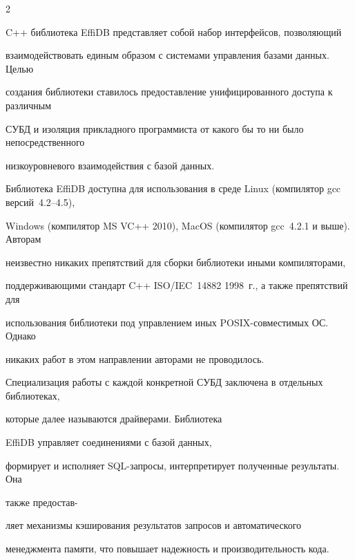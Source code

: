 \begin{multicols}{2}
\vspace*{-6pt}



C++ библиотека EffiDB представляет собой набор интерфейсов, позволяющий 

взаимодействовать единым образом с системами управления базами данных. Целью 

создания библиотеки ставилось предоставление унифицированного доступа к различным 

СУБД и изоляция прикладного программиста от какого бы то ни было непосредственного 

низкоуровневого взаимодействия с базой данных. 



Библиотека EffiDB доступна для использования в среде Linux (компилятор gcc версий~4.2--4.5), 

Windows (компилятор MS VC++ 2010), MacOS (компилятор gcc~4.2.1 и выше). Авторам 

неизвестно никаких препятствий для сборки библиотеки иными компиляторами, 

поддерживающими стандарт C++ ISO/IEC~14882 1998~г., а также препятствий для 

использования библиотеки под управлением иных POSIX-со\-вмес\-ти\-мых ОС. Однако 

никаких работ в этом направлении авторами не проводилось.



Специализация работы с каждой конкретной СУБД заключена в отдельных библиотеках, 

которые далее называются драйверами. Библиотека\linebreak 

\mbox{EffiDB} управ\-ля\-ет соединениями с базой данных,\linebreak 

формирует и исполняет SQL-за\-про\-сы, интерпретирует полученные результаты. Она 

также пред\-остав-\linebreak\vspace*{-12pt}

\pagebreak



\noindent

ля\-ет механизмы кэширования результатов запросов и автоматического 

менеджмента памяти, что повышает надежность и производительность кода.




\end{multicols}
